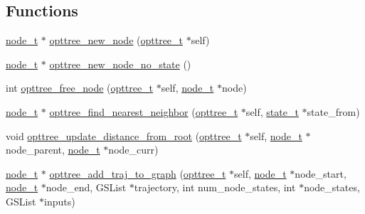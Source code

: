 \subsection*{\-Functions}
\begin{DoxyCompactItemize}
\item 
\hyperlink{a00020_a9c3f304c1ae0687240efd69b7dc98cd6_a9c3f304c1ae0687240efd69b7dc98cd6}{node\-\_\-t} $\ast$ \hyperlink{a00019_a806855fa3cbd142adb06cb12f86af6cf_a806855fa3cbd142adb06cb12f86af6cf}{opttree\-\_\-new\-\_\-node} (\hyperlink{a00020_a07b75293fafb6f31b7e9f723848ad105_a07b75293fafb6f31b7e9f723848ad105}{opttree\-\_\-t} $\ast$self)
\item 
\hyperlink{a00020_a9c3f304c1ae0687240efd69b7dc98cd6_a9c3f304c1ae0687240efd69b7dc98cd6}{node\-\_\-t} $\ast$ \hyperlink{a00019_a7a0fd222dbfa68db41e0cfda4653a0fd_a7a0fd222dbfa68db41e0cfda4653a0fd}{opttree\-\_\-new\-\_\-node\-\_\-no\-\_\-state} ()
\item 
int \hyperlink{a00019_ac3ec357f9dc6bf3500abf3da09a50fdf_ac3ec357f9dc6bf3500abf3da09a50fdf}{opttree\-\_\-free\-\_\-node} (\hyperlink{a00020_a07b75293fafb6f31b7e9f723848ad105_a07b75293fafb6f31b7e9f723848ad105}{opttree\-\_\-t} $\ast$self, \hyperlink{a00020_a9c3f304c1ae0687240efd69b7dc98cd6_a9c3f304c1ae0687240efd69b7dc98cd6}{node\-\_\-t} $\ast$node)
\item 
\hyperlink{a00020_a9c3f304c1ae0687240efd69b7dc98cd6_a9c3f304c1ae0687240efd69b7dc98cd6}{node\-\_\-t} $\ast$ \hyperlink{a00019_ad0c1d9701587dc00f5978ee460b095b9_ad0c1d9701587dc00f5978ee460b095b9}{opttree\-\_\-find\-\_\-nearest\-\_\-neighbor} (\hyperlink{a00020_a07b75293fafb6f31b7e9f723848ad105_a07b75293fafb6f31b7e9f723848ad105}{opttree\-\_\-t} $\ast$self, \hyperlink{a00018_a1c9d0bb39483d4981491e6383b0dbb47_a1c9d0bb39483d4981491e6383b0dbb47}{state\-\_\-t} $\ast$state\-\_\-from)
\item 
void \hyperlink{a00019_a837559b8536b59875d2a4ae3389997b9_a837559b8536b59875d2a4ae3389997b9}{opttree\-\_\-update\-\_\-distance\-\_\-from\-\_\-root} (\hyperlink{a00020_a07b75293fafb6f31b7e9f723848ad105_a07b75293fafb6f31b7e9f723848ad105}{opttree\-\_\-t} $\ast$self, \hyperlink{a00020_a9c3f304c1ae0687240efd69b7dc98cd6_a9c3f304c1ae0687240efd69b7dc98cd6}{node\-\_\-t} $\ast$node\-\_\-parent, \hyperlink{a00020_a9c3f304c1ae0687240efd69b7dc98cd6_a9c3f304c1ae0687240efd69b7dc98cd6}{node\-\_\-t} $\ast$node\-\_\-curr)
\item 
\hyperlink{a00020_a9c3f304c1ae0687240efd69b7dc98cd6_a9c3f304c1ae0687240efd69b7dc98cd6}{node\-\_\-t} $\ast$ \hyperlink{a00019_ac34ccb07ab6ad6b4ea9a46eb2e1d4bc9_ac34ccb07ab6ad6b4ea9a46eb2e1d4bc9}{opttree\-\_\-add\-\_\-traj\-\_\-to\-\_\-graph} (\hyperlink{a00020_a07b75293fafb6f31b7e9f723848ad105_a07b75293fafb6f31b7e9f723848ad105}{opttree\-\_\-t} $\ast$self, \hyperlink{a00020_a9c3f304c1ae0687240efd69b7dc98cd6_a9c3f304c1ae0687240efd69b7dc98cd6}{node\-\_\-t} $\ast$node\-\_\-start, \hyperlink{a00020_a9c3f304c1ae0687240efd69b7dc98cd6_a9c3f304c1ae0687240efd69b7dc98cd6}{node\-\_\-t} $\ast$node\-\_\-end, \-G\-S\-List $\ast$trajectory, int num\-\_\-node\-\_\-states, int $\ast$node\-\_\-states, \-G\-S\-List $\ast$inputs)

\end{DoxyCompactItemize}

